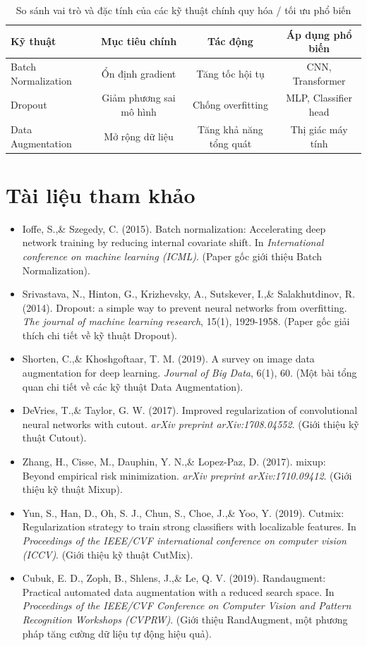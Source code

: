 \begin{table}[h!]
	\centering
	\caption{So sánh vai trò và đặc tính của các kỹ thuật chính quy hóa / tối ưu phổ biến}
	\begin{tabular}{lccc}
		\toprule
		\textbf{Kỹ thuật} & \textbf{Mục tiêu chính} & \textbf{Tác động} & \textbf{Áp dụng phổ biến} \\
		\midrule
		Batch Normalization & Ổn định gradient & Tăng tốc hội tụ & CNN, Transformer \\
		Dropout & Giảm phương sai mô hình & Chống overfitting & MLP, Classifier head \\
		Data Augmentation & Mở rộng dữ liệu & Tăng khả năng tổng quát & Thị giác máy tính \\
		\bottomrule
	\end{tabular}
\end{table}

\section*{Tài liệu tham khảo}
\begin{itemize}
	\item[1] Ioffe, S.,\& Szegedy, C. (2015). Batch normalization: Accelerating deep network training by reducing internal covariate shift. In \textit{International conference on machine learning (ICML)}. (Paper gốc giới thiệu Batch Normalization).
	\item[2] Srivastava, N., Hinton, G., Krizhevsky, A., Sutskever, I.,\& Salakhutdinov, R. (2014). Dropout: a simple way to prevent neural networks from overfitting. \textit{The journal of machine learning research}, 15(1), 1929-1958. (Paper gốc giải thích chi tiết về kỹ thuật Dropout).
	\item[3] Shorten, C.,\& Khoshgoftaar, T. M. (2019). A survey on image data augmentation for deep learning. \textit{Journal of Big Data}, 6(1), 60. (Một bài tổng quan chi tiết về các kỹ thuật Data Augmentation).
	\item[4] DeVries, T.,\& Taylor, G. W. (2017). Improved regularization of convolutional neural networks with cutout. \textit{arXiv preprint arXiv:1708.04552}. (Giới thiệu kỹ thuật Cutout).
	\item[5] Zhang, H., Cisse, M., Dauphin, Y. N.,\& Lopez-Paz, D. (2017). mixup: Beyond empirical risk minimization. \textit{arXiv preprint arXiv:1710.09412}. (Giới thiệu kỹ thuật Mixup).
	\item[6] Yun, S., Han, D., Oh, S. J., Chun, S., Choe, J.,\& Yoo, Y. (2019). Cutmix: Regularization strategy to train strong classifiers with localizable features. In \textit{Proceedings of the IEEE/CVF international conference on computer vision (ICCV)}. (Giới thiệu kỹ thuật CutMix).
	\item[7] Cubuk, E. D., Zoph, B., Shlens, J.,\& Le, Q. V. (2019). Randaugment: Practical automated data augmentation with a reduced search space. In \textit{Proceedings of the IEEE/CVF Conference on Computer Vision and Pattern Recognition Workshops (CVPRW)}. (Giới thiệu RandAugment, một phương pháp tăng cường dữ liệu tự động hiệu quả).
\end{itemize}